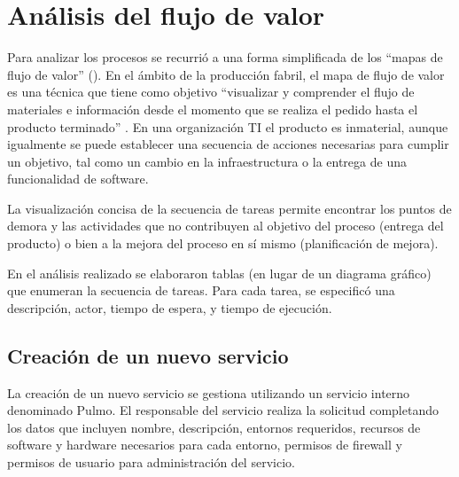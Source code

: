 \section{Análisis del flujo de valor}
%
Para analizar los procesos se recurrió a una forma simplificada de los
``mapas de flujo de valor'' (). En el ámbito de
la producción fabril, el mapa de flujo de valor es una técnica
 que tiene como objetivo ``visualizar y comprender el flujo de
materiales e información desde el momento que se realiza el pedido
hasta el producto terminado'' \cite{learningtosee}. En una
organización TI el producto es inmaterial, aunque igualmente se puede
establecer una secuencia de acciones necesarias para cumplir un
objetivo, tal como un cambio en la infraestructura o la entrega de una
funcionalidad de software.

La visualización concisa de la secuencia de tareas permite encontrar
los puntos de demora y las actividades que no contribuyen al objetivo
del proceso (entrega del producto) o bien a la mejora del proceso en
sí mismo (planificación de mejora).

En el análisis realizado se elaboraron tablas (en lugar de un diagrama
gráfico) que enumeran la secuencia de tareas. Para cada tarea, se
especificó una descripción, actor, tiempo de espera, y tiempo de
ejecución.
%
\subsection{Creación de un nuevo servicio}
%
La creación de un nuevo servicio se gestiona utilizando un servicio
interno denominado Pulmo. El responsable del servicio realiza la
solicitud completando los datos que incluyen nombre, descripción,
entornos requeridos, recursos de software y hardware necesarios para
cada entorno, permisos de firewall y permisos de usuario para
administración del servicio.

